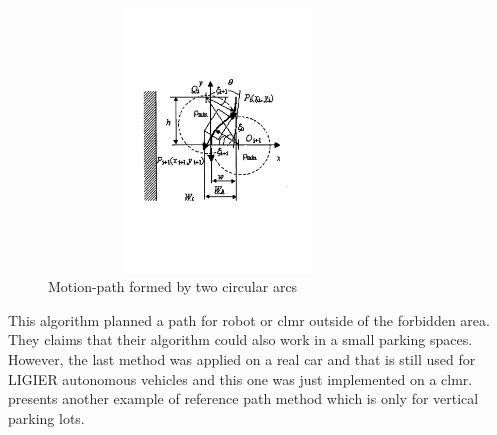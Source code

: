 \begin{figure}
    \centering
    \includegraphics[width=9cm, height=7cm]{images/2circlePath.pdf}
    \caption{Motion-path formed by two circular arcs\cite{twoCircles}}
    \label{fig:2CirclePath}
\end{figure}
This algorithm planned a path for robot or \acrshort{clmr} outside of the forbidden area. They claims that their algorithm could also work in a small parking spaces. However, the last method was applied on a real car and that is still used for LIGIER autonomous vehicles and this one was just implemented on a \acrshort{clmr}. \cite{novel-CLMR} presents another example of reference path method which is only for vertical parking lots.
